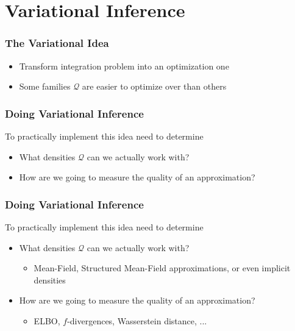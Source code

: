 \documentclass[10pt,mathserif]{beamer}
\begin{document}
\section{Variational Inference}
\label{sec:introduction}

\begin{frame}
  \frametitle{The Variational Idea}
  \begin{itemize}
  \item Transform integration problem into an optimization one
  \item Some families $\mathcal{Q}$ are easier to optimize over than others
  \end{itemize} 
\end{frame}

\begin{frame}
  \frametitle{Doing Variational Inference}
  To practically implement this idea need to determine
  \begin{itemize}
  \item What densities $\mathcal{Q}$ can we actually work with?
  \item How are we going to measure the quality of an approximation?
  \end{itemize} 
\end{frame}

\begin{frame}
  \frametitle{Doing Variational Inference}
  To practically implement this idea need to determine
  \begin{itemize}
  \item What densities $\mathcal{Q}$ can we actually work with?
    \begin{itemize}
    \item Mean-Field, Structured Mean-Field approximations, or even implicit densities
    \end{itemize}
  \item How are we going to measure the quality of an approximation?
    \begin{itemize}
    \item ELBO, $f$-divergences, Wasserstein distance, ...
    \end{itemize}
  \end{itemize} 
\end{frame}
\end{document}
